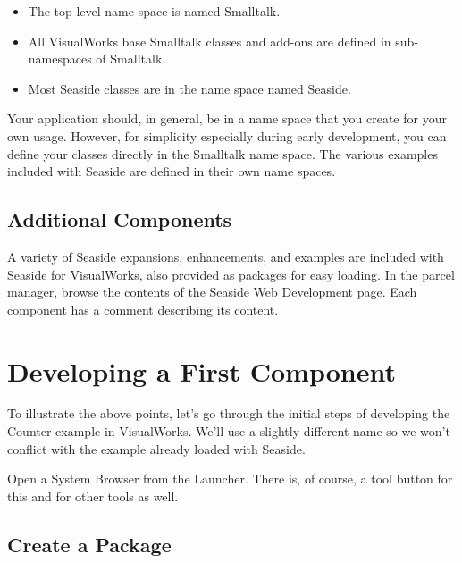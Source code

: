 \documentclass[a4paper,10pt,twoside]{book}
\begin{document}
\begin{itemize}
\item  The top-level name space is named Smalltalk. 
\item  All VisualWorks base Smalltalk classes and add-ons are defined in sub-namespaces of Smalltalk. 
\item  Most Seaside classes are in the name space named Seaside. 
\end{itemize}

Your application should, in general, be in a name space that you create for your own usage. However, for simplicity especially during early development, you can define your classes directly in the Smalltalk name space. The various examples included with Seaside are defined in their own name spaces.

\subsection{Additional Components}
\label{book:gettingstarted:cincomsmalltalk:developing:additional}

A variety of Seaside expansions, enhancements, and examples are included with Seaside for VisualWorks, also provided as packages for easy loading. In the parcel manager, browse the contents of the Seaside Web Development page. Each component has a comment describing its content.

\section{Developing a First Component}
\label{book:gettingstarted:cincomsmalltalk:component}

To illustrate the above points, let's go through the initial steps of developing the Counter example in VisualWorks. We'll use a slightly different name so we won't conflict with the example already loaded with Seaside.

Open a System Browser from the Launcher. There is, of course, a tool button for this and for other tools as well.

\subsection{Create a Package}
\label{book:gettingstarted:cincomsmalltalk:component:package}
\end{document}
